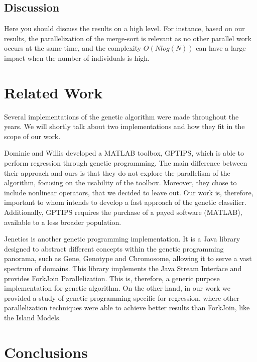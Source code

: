 \documentclass[runningheads]{llncs}
\begin{document}
\subsection{Discussion}

Here you should discuss the results on a high level. For instance, based on our results, the parallelization of the merge-sort is relevant as no other parallel work occurs at the same time, and the complexity $O(N log(N))$ can have a large impact when the number of individuals is high.

\section{Related Work}

Several implementations of the genetic algorithm were made throughout the years. We will shortly talk about two implementations and how they fit in the scope of our work.

Dominic and Willis  \cite{GPTIPS} developed a MATLAB toolbox, GPTIPS, which is able to perform regression through genetic programming. The main difference between their approach and  ours is that they do not explore the parallelism of the algorithm, focusing on the usability of the toolbox. Moreover, they chose to include nonlinear operators, that we decided to leave out. Our work is, therefore, important to whom intends to develop a fast approach of the genetic classifier. Additionally, GPTIPS requires the purchase of a payed software (MATLAB), available to a less broader population.

Jenetics \cite{jenetics} is another genetic programming implementation. It is a Java library designed to abstract different concepts within the genetic programming panorama, such as Gene, Genotype and Chromosome, allowing it to serve a vast spectrum of domains. This library implements the Java Stream Interface and provides ForkJoin Parallelization. This is, therefore, a generic purpose implementation for genetic algorithm. On the other hand, in our work we provided a study of genetic programming specific for regression, where other parallelization techniques were able to achieve better results than ForkJoin, like the Island Models.

\section{Conclusions}
\end{document}
